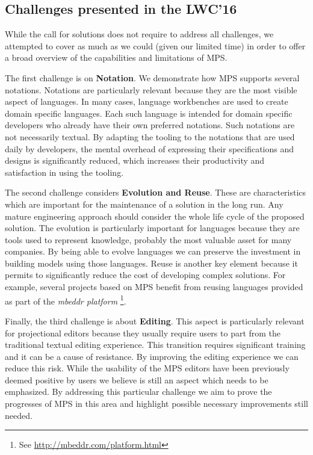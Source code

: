\documentclass[preprint,numbers,10pt]{sigplanconf}
\newcommand\ana[1]{\textcolor{red}{ANA: {#1}}}
\begin{document}
%

\subsection{Challenges presented in the LWC'16}

While the call for solutions does not require to address all challenges, we attempted to cover as much as we could (given our limited time) in order to offer a broad overview of the capabilities and limitations of MPS.

The first challenge is on \textbf{Notation}. We demonstrate how MPS supports several notations. Notations are particularly relevant because they are the most visible aspect of languages. In many cases, language workbenches are used to create domain
specific languages. Each such language is intended for domain specific developers who already have their own preferred notations. Such notations are not necessarily textual. By adapting the tooling to the notations that are used daily by developers, the mental overhead of expressing their specifications and designs is significantly reduced, which increases their productivity and satisfaction in using the tooling.

The second challenge considers \textbf{Evolution and Reuse}. These are
characteristics which are important for the maintenance of a solution in the long run. Any
mature engineering approach should consider the whole life cycle of the proposed
solution. The evolution is particularly important for languages because they are
tools used to represent knowledge, probably the most valuable asset for many
companies. By being able to evolve languages we can preserve the investment
in building models using those languages. Reuse is another key element because
it permits to significantly reduce the cost of developing complex solutions. For
example, several projects based on MPS benefit from reusing languages provided
as part of the \emph{mbeddr platform} \footnote{See
\url{http://mbeddr.com/platform.html}}.

Finally, the third challenge is about \textbf{Editing}. This aspect is
particularly relevant for projectional editors because they usually require
users to part from the traditional textual editing experience. This transition
requires significant training and it can be a cause of resistance. By improving
the editing experience we can reduce this risk. While the usability of the MPS
editors have been previously deemed positive by users \cite{Voelter2014} we
believe is still an aspect which needs to be emphasized. By addressing this
particular challenge we aim to prove the progresses of MPS in this area and
highlight possible necessary improvements still needed.
\end{document}
